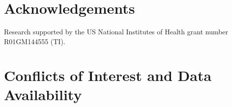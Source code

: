 \documentclass[iucr,review]{iucrjournals}
\begin{document}





\section*{Acknowledgements}
Research supported by the US National Institutes of Health grant number R01GM144555 (TI).

\section*{Conflicts of Interest and Data Availability} 





\appendix

\end{document}
